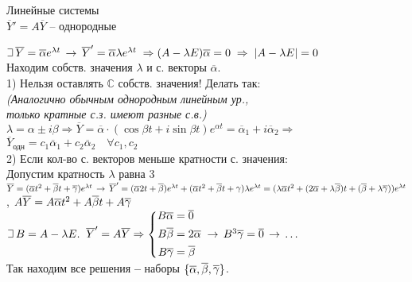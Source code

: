 \documentclass[11pt,a4paper]{article}
\newcommand{\romannum}[1]{\MakeUppercase{\romannumeral #1}}
\newcommand*\circled[1]{\tikz[baseline=(char.base)]{\node[shape=circle,draw,inner sep=2pt] (char) {#1};}}
\newcommand{\newgamma}{\raisebox{0.05em}{$\gamma$}}
\def\letus{%
    \mathord{\setbox0=\hbox{$\exists$}%
             \hbox{\kern 0.125\wd0%
                   \vbox to \ht0{%
                      \hrule width 0.75\wd0%
                      \vfill%
                      \hrule width 0.75\wd0}%
                   \vrule height \ht0%
                   \kern 0.125\wd0}%
           }%
    \,
}
\newcommand{\infers}{\,\to\,}
\newcommand{\textinfers}{\;\Rightarrow\;}
\newcommand{\bfend}{\textbf{--} }
\newcommand{\mat}[1]{\overline{#1}}
\begin{document}
\parbox[t][][t]{0.48\textwidth}{
{\centering %
\scalebox{1.8}{\romannum{3$'$}.} Линейные системы\\
\circled{\romannum{1}}\quad $\mat{Y}' = A\mat{Y}$ -- однородные\\\vspace{0.5em}
}

$\letus \mat{Y} = \mat{\alpha} e^{\lambda t} \infers \mat{Y}' = \mat{\alpha}\lambda e^{\lambda t} \textinfers\\ (A - \lambda E)\mat{\alpha} = 0 \textinfers |A - \lambda E| = 0$\\
Находим собств. значения $\lambda$ и с. векторы $\mat{\alpha}$.\\

1) Нельзя оставлять $\mathbb{C}$ собств. значения! Делать так:\\
\small{\it (Аналогично обычным однородным линейным ур.,\\ только кратные с.з. имеют разные с.в.)}\\
$\lambda = \alpha\pm i\beta \Rightarrow \mat{Y} = \mat{\alpha} \cdot (\cos\beta t + i\sin\beta t)e^{\alpha t} = \mat{\alpha}_1 + i\mat{\alpha}_2 \Rightarrow$\\
$\mat{Y}_{\text{одн}} = c_1\mat{\alpha}_1 + c_2\mat{\alpha}_2\quad \forall c_1, c_2$\\

2) Если кол-во с. векторов меньше кратности с. значения:\\
Допустим кратность $\lambda$ равна $3$\\
 $\mat{Y} = (\mat{\alpha}t^2 + \mat{\beta}t + \mat{\newgamma}) e^{\lambda t} \infers \mat{Y}' = (\mat{\alpha} 2t + \mat{\beta})e^{\lambda t} + (\mat{\alpha}t^2 + \mat{\beta} t + \newgamma)\lambda e^{\lambda t} = (\lambda \mat{\alpha}t^2 + (2\mat{\alpha} + \lambda\mat{\beta})t + (\mat{\beta} + \lambda\mat{\newgamma}) )e^{\lambda t}   $, $A\mat{Y} = A\mat{\alpha}t^2 + A\mat{\beta}t + A\mat{\newgamma}$\\
 $\letus B = A - \lambda E.\;\;\mat{Y}' = A\mat{Y} \Rightarrow \left\{ \begin{aligned}
B\mat{\alpha} &= \mat{0}\\
B\mat{\beta} &= 2\mat{\alpha}\\
B\mat{\newgamma} &= \mat{\beta}\\
\end{aligned} \right. \infers B^3\mat{\newgamma} = \mat{0} \infers\ldots$\\
Так находим все решения \bfend наборы $\{\mat{\alpha}, \mat{\beta}, \mat{\newgamma}\}$.\\


}
\end{document}
